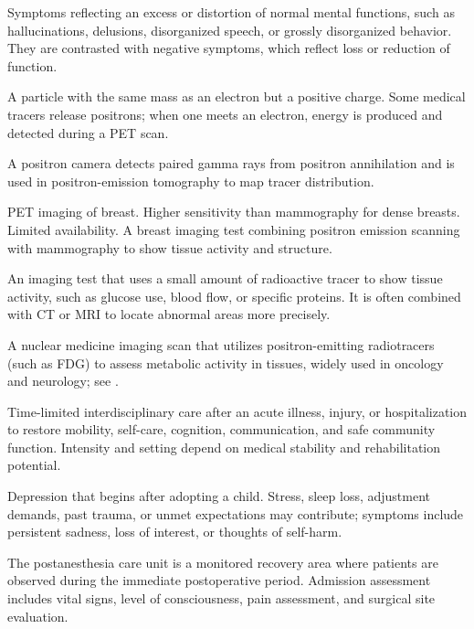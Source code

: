  Symptoms reflecting an excess or distortion of normal mental functions, such as
hallucinations, delusions, disorganized speech, or grossly disorganized behavior. They
are contrasted with negative symptoms, which reflect loss or reduction of function.

 A particle with the same mass as an electron but a positive charge. Some medical tracers release positrons; when one meets an electron, energy is produced and detected during a PET scan.

 A positron camera detects paired gamma rays from positron annihilation and is used in positron-emission tomography to map tracer distribution.

 PET imaging of breast. Higher sensitivity than mammography for dense breasts. Limited availability. A breast imaging test combining positron emission scanning with mammography to show tissue activity and structure.

 An imaging test that uses a small amount of radioactive tracer to show tissue activity, such as glucose use, blood flow, or specific proteins. It is often combined with CT or MRI to locate abnormal areas more precisely.

 A nuclear medicine imaging scan that utilizes positron-emitting radiotracers (such as FDG) to assess metabolic activity in tissues, widely used in oncology and neurology; see .

 Time-limited interdisciplinary care after an acute illness, injury, or hospitalization
to restore mobility, self-care, cognition, communication, and safe community function.
Intensity and setting depend on medical stability and rehabilitation potential.

 Depression that begins after adopting a child. Stress, sleep loss, adjustment demands, past trauma, or unmet expectations may contribute; symptoms include persistent sadness, loss of interest, or thoughts of self-harm.

 The postanesthesia care unit is a monitored recovery area where patients are
observed during the immediate postoperative period. Admission assessment includes vital
signs, level of consciousness, pain assessment, and surgical site evaluation.

